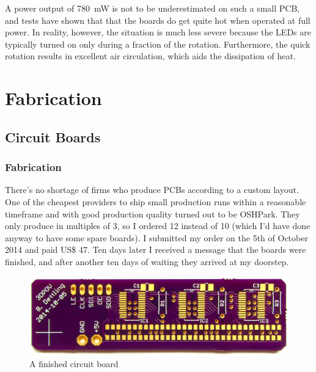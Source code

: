 \documentclass[a4paper, 11pt, titlepage]{report}
\begin{document}
A power output of \SI{780}{\milli\watt} is not to be underestimated on such a small PCB, and tests
have shown that that the boards do get quite hot when operated at full power. In reality, however,
the situation is much less severe because the LEDs are typically turned on only during a fraction
of the rotation. Furthermore, the quick rotation results in excellent air circulation, which aids
the dissipation of heat.









\chapter{Fabrication}

\section{Circuit Boards}

\subsection{Fabrication}

There's no shortage of firms who produce PCBs according to a custom layout. One of the cheapest
providers to ship small production runs within a reasonable timeframe and with good production
quality turned out to be OSHPark. They only produce in multiples of 3, so I ordered 12 instead of
10 (which I'd have done anyway to have some spare boards). I submitted my order on the 5th of
October 2014 and paid US\$ 47. Ten days later I received a message that the boards were finished,
and after another ten days of waiting they arrived at my doorstep.


\begin{figure}[h]
\vspace{3mm}
\includegraphics[width=\textwidth]{./images/board-finished.jpeg}
\vspace{-8mm}
\caption{A finished circuit board}
\end{figure}
\end{document}
